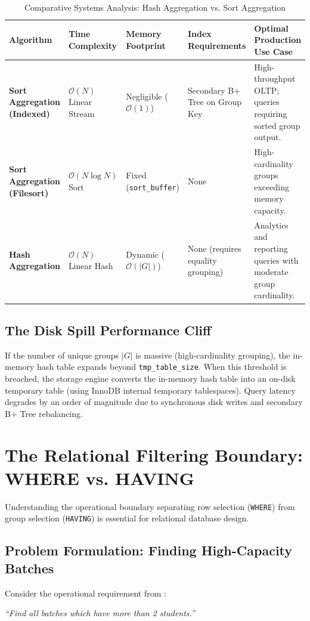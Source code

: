 \documentclass[10pt,twocolumn,letterpaper]{article}
\begin{document}
\begin{table}[htbp]
\caption{Comparative Systems Analysis: Hash Aggregation vs. Sort Aggregation}
\label{tab:aggregation_algorithms}
\centering
\scriptsize
\begin{tabular}{p{2.4cm}p{2.2cm}p{2.4cm}p{3.0cm}p{4.4cm}}
\toprule
\textbf{Algorithm} & \textbf{Time Complexity} & \textbf{Memory Footprint} & \textbf{Index Requirements} & \textbf{Optimal Production Use Case} \\
\midrule
\textbf{Sort Aggregation (Indexed)} & $\mathcal{O}(N)$ Linear Stream & Negligible ($\mathcal{O}(1)$) & Secondary B+ Tree on Group Key & High-throughput OLTP; queries requiring sorted group output. \\
\textbf{Sort Aggregation (Filesort)} & $\mathcal{O}(N \log N)$ Sort & Fixed (\texttt{sort\_buffer}) & None & High-cardinality groups exceeding memory capacity. \\
\textbf{Hash Aggregation} & $\mathcal{O}(N)$ Linear Hash & Dynamic ($\mathcal{O}(|G|)$) & None (requires equality grouping) & Analytics and reporting queries with moderate group cardinality. \\
\bottomrule
\end{tabular}
\end{table}

\subsection{The Disk Spill Performance Cliff}
If the number of unique groups $|G|$ is massive (high-cardinality grouping), the in-memory hash table expands beyond \texttt{tmp\_table\_size}. When this threshold is breached, the storage engine converts the in-memory hash table into an on-disk temporary table (using InnoDB internal temporary tablespaces). Query latency degrades by an order of magnitude due to synchronous disk writes and secondary B+ Tree rebalancing.

\section{The Relational Filtering Boundary: WHERE vs. HAVING}
\label{sec:where_vs_having}

Understanding the operational boundary separating row selection (\texttt{WHERE}) from group selection (\texttt{HAVING}) is essential for relational database design.

\subsection{Problem Formulation: Finding High-Capacity Batches}
Consider the operational requirement from \cite{sql5lecture}:
\begin{center}
\textit{``Find all batches which have more than 2 students.''}
\end{center}
\end{document}
